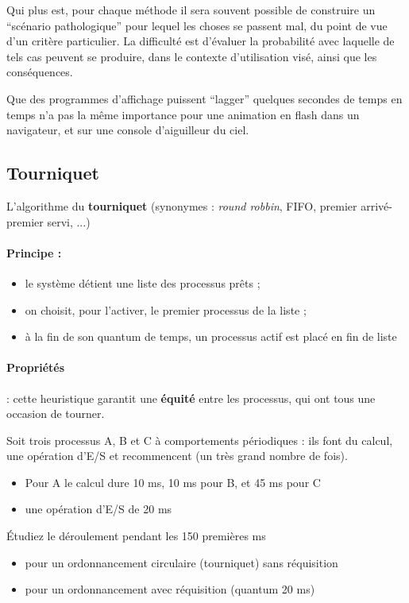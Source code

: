 \begin{multicols}{2}
Qui plus est, pour chaque méthode il sera souvent possible de
construire un ``scénario pathologique'' pour lequel les choses se
passent mal, du point de vue d'un critère particulier.  La difficulté est
d'évaluer la probabilité avec laquelle de tels cas peuvent se
produire, dans le contexte d'utilisation visé, ainsi que les
conséquences.

Que des programmes d'affichage puissent
``lagger'' quelques secondes de temps en temps n'a pas la même
importance pour une animation en flash dans un navigateur, et  sur une console
d'aiguilleur du ciel.

\subsection{Tourniquet}

L'algorithme du \textbf{tourniquet} (synonymes : \emph{round robbin},
FIFO, premier arrivé-premier servi, ...)

\paragraph{Principe :}
\begin{itemize}
   \item le système détient une liste des processus prêts ;
  \item on choisit, pour l'activer, le premier processus de la liste ;
\item à la fin de son quantum de temps, un processus actif est placé
en fin de liste
\end{itemize}

\paragraph{Propriétés} :  cette heuristique garantit une \textbf{équité} entre les processus, qui ont tous une occasion de tourner.

\begin{exercice}
Soit trois  processus A, B et C à comportements périodiques : ils font du calcul, une opération d'E/S et recommencent (un très grand nombre de fois).
\begin{itemize}
 \item
  Pour A le calcul dure 10  ms, 10 ms pour B, et 45 ms pour C
\item
   une opération d'E/S de 20 ms
\end{itemize}

Étudiez le déroulement pendant les 150 premières ms
\begin{itemize} 
\item pour un ordonnancement circulaire (tourniquet) sans réquisition
\item pour un ordonnancement avec réquisition (quantum 20 ms)
 \end{itemize}


\end{exercice}
\end{multicols}
